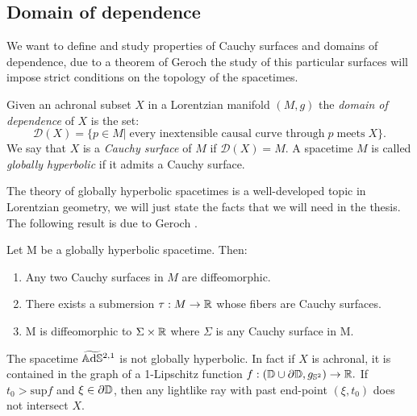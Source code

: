 \subsection{Domain of dependence}
We want to define and study properties of Cauchy surfaces and domains of dependence, due to a theorem of Geroch \cite{hawking2023large} the study of this particular surfaces will impose strict conditions on the topology of the spacetimes.

\begin{definition}
    Given an achronal subset $X$ in a Lorentzian manifold $(M,g)$ the \textit{domain of dependence} of $X$ is the set: 
    \[
        \mathcal{D}(X)=\{p\in M |\;\text{every inextensible causal curve through}\; p\; \text{meets}\; X \}.
    \]
    We say that $X$ is a \textit{Cauchy surface} of $M$ if $\mathcal{D}(X)=M$. A spacetime $M$ is called \textit{globally hyperbolic} if it admits a Cauchy surface.
\end{definition}
    

The theory of globally hyperbolic spacetimes is a well-developed topic in Lorentzian geometry, we will just state the facts that we will need in the thesis. The following result is due to Geroch \cite{hawking2023large}. 

\begin{theorem}\label{442}
    Let M be a globally hyperbolic spacetime. Then:
    \begin{enumerate}
        \item Any two Cauchy surfaces in $M$ are diffeomorphic. 
        \item There exists a submersion $\tau:M\to\mathbb{R}$ whose fibers are Cauchy surfaces.
        \item M is diffeomorphic to $\Sigma\times\mathbb{R}$ where $\Sigma$ is any Cauchy surface in M.
    \end{enumerate}
\end{theorem}

\begin{observation}
    The spacetime $\widetilde{\mathbb{A}\mathrm{d}\mathbb{S}}{}^{2,1}$ is not globally hyperbolic. In fact if $X$ is achronal, it is contained in the graph of a 1-Lipschitz function $f:(\mathbb{D}\cup\partial\mathbb{D},g_{\mathbb{S}^2})\to\mathbb{R}.$ If $t_0>\text{sup}f$ and $\xi \in \partial\mathbb{D}$, then any lightlike ray with past end-point $(\xi,t_0)$ does not intersect $X.$ 
\end{observation}

